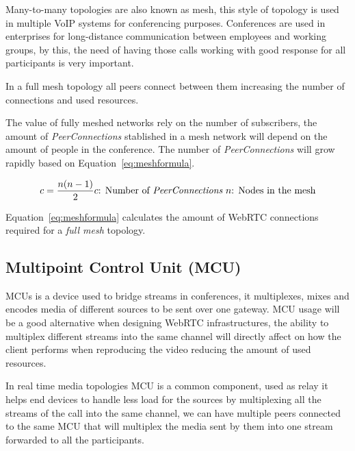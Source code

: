 Many-to-many topologies are also known as mesh, this style of topology is used in multiple VoIP systems for conferencing purposes. Conferences are used in enterprises for long-distance communication between employees and working groups, by this, the need of having those calls working with good response for all participants is very important.

In a full mesh topology all peers connect between them increasing the number of connections and used resources.

The value of fully meshed networks rely on the number of subscribers, the amount of {\it PeerConnections} stablished in a mesh network will depend on the amount of people in the conference. The number of {\it PeerConnections} will grow rapidly based on Equation~\ref{eq:meshformula}.

\begin{equation}
	\label{eq:meshformula}
	c = \frac{n(n-1)}{2}\\
	
	c \text{: Number of {\it PeerConnections}}\
		
	n \text{: Nodes in the mesh}
\end{equation}

Equation~\ref{eq:meshformula} calculates the amount of WebRTC connections required for a {\it full mesh} topology. 


\subsection{Multipoint Control Unit (MCU)}

MCUs  is a device used to bridge streams in conferences, it multiplexes, mixes and encodes media of different sources to be sent over one gateway. MCU usage will be a good alternative when designing WebRTC infrastructures, the ability to multiplex different streams into the same channel will directly affect on how the client performs when reproducing the video reducing the amount of used resources. 

In real time media topologies MCU is a common component, used as relay it helps end devices to handle less load for the sources by multiplexing all the streams of the call into the same channel, we can have multiple peers connected to the same MCU that will multiplex the media sent by them into one stream forwarded to all the participants.

